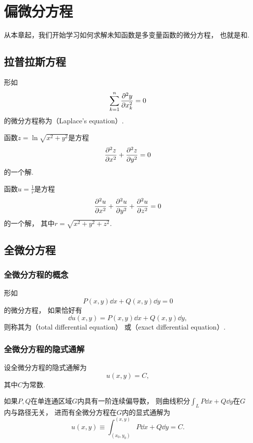 \chapter{偏微分方程}
从本章起，我们开始学习如何求解未知函数是多变量函数的微分方程，
也就是和.

\section{拉普拉斯方程}
\begin{definition}
形如\[
	\sum_{k=1}^n \pdv[2]{y}{x_k} = 0
\]的微分方程称为（Laplace's equation）.
\end{definition}

\begin{example}
函数\(z=\ln\sqrt{x^2+y^2}\)是方程\[
	\pdv[2]{z}{x} + \pdv[2]{z}{y} = 0
\]的一个解.
\end{example}

\begin{example}
函数\(u=\frac{1}{r}\)是方程\[
	\pdv[2]{u}{x} + \pdv[2]{u}{y} + \pdv[2]{u}{z} = 0
\]的一个解，
其中\(r=\sqrt{x^2+y^2+z^2}\).
\end{example}

\section{全微分方程}
\subsection{全微分方程的概念}
\begin{definition}
形如\[
	P(x,y)\dd{x} + Q(x,y)\dd{y} = 0
\]的微分方程，
如果恰好有\[
	\dd{u(x,y)} = P(x,y)\dd{x} + Q(x,y)\dd{y},
\]
则称其为（total differential equation）%
或（exact differential equation）.
\end{definition}

\subsection{全微分方程的隐式通解}
设全微分方程的隐式通解为\[
	u(x,y) = C,
\]
其中\(C\)为常数.

如果\(P,Q\)在单连通区域\(G\)内具有一阶连续偏导数，
则曲线积分\(\int_L P\dd{x}+Q\dd{y}\)在\(G\)内与路径无关，
进而有全微分方程在\(G\)内的显式通解为\[
	u(x,y) \equiv \int_{(x_0,y_0)}^{(x,y)} P\dd{x}+Q\dd{y} = C.
\]

